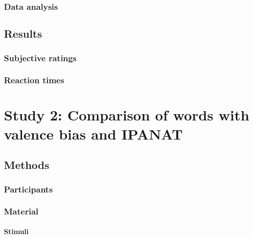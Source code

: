 \documentclass[man]{apa6}
\let\oldparagraph\paragraph
\renewcommand{\paragraph}[1]{\oldparagraph{#1}\mbox{}}
\begin{document}
\hypertarget{data-analysis}{%
\subsubsection{Data analysis}\label{data-analysis}}

\hypertarget{results}{%
\subsection{Results}\label{results}}

\hypertarget{subjective-ratings}{%
\subsubsection{Subjective ratings}\label{subjective-ratings}}

\hypertarget{reaction-times}{%
\subsubsection{Reaction times}\label{reaction-times}}

\hypertarget{study-2-comparison-of-words-with-valence-bias-and-ipanat}{%
\section{Study 2: Comparison of words with valence bias and IPANAT}\label{study-2-comparison-of-words-with-valence-bias-and-ipanat}}

\hypertarget{methods-1}{%
\subsection{Methods}\label{methods-1}}

\hypertarget{participants-1}{%
\subsubsection{Participants}\label{participants-1}}

\hypertarget{material-1}{%
\subsubsection{Material}\label{material-1}}

\hypertarget{stimuli-1}{%
\paragraph{Stimuli}\label{stimuli-1}}
\end{document}

